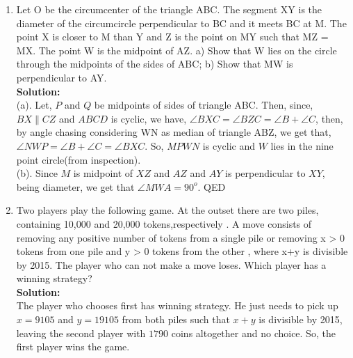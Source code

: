 \documentclass{article}
\begin{document}
\begin{enumerate}
    
    
    
    
    \newpage
    
    \item Let O be the circumcenter of the triangle ABC. The segment XY is the diameter of the circumcircle perpendicular to BC and it meets BC at M. The point X is closer to M than Y and Z is the point on MY such that MZ = MX. The point W is the midpoint of AZ. a) Show that W lies on the circle through the midpoints of the sides of ABC; b) Show that MW is perpendicular to AY.\\
    \textbf{Solution:}\\
    (a). Let, $P$ and $Q$ be midpoints of sides of triangle ABC. Then, since, $BX\parallel CZ$ and $ABCD$ is cyclic, we have, $\angle BXC =\angle BZC = \angle B+ \angle C $, then, by angle chasing considering WN as median of triangle ABZ, we get that,\\
    $\angle NWP = \angle B +\angle C=\angle BXC$. So, $MPWN$ is cyclic and $W$ lies in the nine point circle(from inspection). \\
    (b). Since $M$ is midpoint of $XZ$ and $AZ$ and $AY$ is perpendicular to $XY$, being diameter, we get that $\angle MWA=90^o$. QED
    
    \newpage
    
    \item Two players play the following game. At the outset there are two piles, containing 10,000 and 20,000 tokens,respectively . A move consists of removing any positive number of tokens from a single pile or removing x > 0 tokens from one pile and y > 0 tokens from the other , where x+y is divisible by 2015. The player who can not make a move loses. Which player has a winning strategy? \\
    \textbf{Solution:}\\
    
    The player who chooses first has winning strategy. He just needs to pick up 
$x=9105$ and $y=19105$ from both piles such that $x+y$ is divisible by 2015, leaving the second player with $1790$ coins altogether and no choice.
So, the first player wins the game.

\newpage


\end{enumerate}
\end{document}

